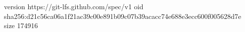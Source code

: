 version https://git-lfs.github.com/spec/v1
oid sha256:d21c56ca06a1f21ac39c00e891b09c07b39acacc74e688e3ecc600f005628d7e
size 174916
